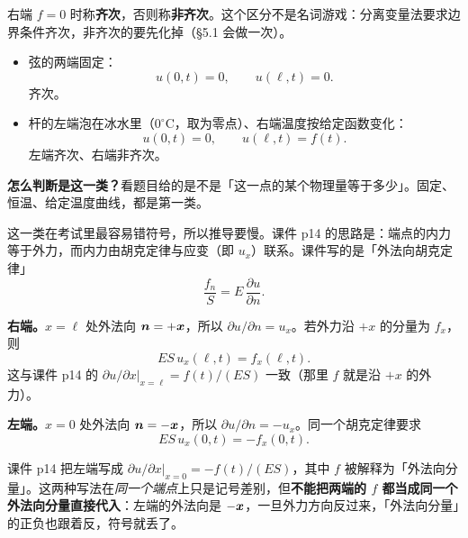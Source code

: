 \documentclass[11pt]{ctexart}
\let\origsubhdr\subhdr
\renewcommand{\subhdr}[1]{\par\needspace{3\baselineskip}\origsubhdr{#1}}
\begin{document}
右端 $f=0$ 时称\textbf{齐次}，否则称\textbf{非齐次}。这个区分不是名词游戏：分离变量法要求边界条件齐次，非齐次的要先化掉（\S5.1 会做一次）。


\begin{itemize}
  \item 弦的两端固定：
  \begin{equation}
    u(0,t)=0,\qquad u(\ell,t)=0 .
  \end{equation}
  齐次。
  \item 杆的左端泡在冰水里（$0^\circ\mathrm C$，取为零点）、右端温度按给定函数变化：
  \begin{equation}
    u(0,t)=0,\qquad u(\ell,t)=f(t).
  \end{equation}
  左端齐次、右端非齐次。
\end{itemize}

\textbf{怎么判断是这一类？}看题目给的是不是「这一点的某个物理量等于多少」。固定、恒温、给定温度曲线，都是第一类。

\label{sec:bc2}

这一类在考试里最容易错符号，所以推导要慢。课件 p14 的思路是：端点的内力等于外力，而内力由胡克定律与应变（即 $u_x$）联系。课件写的是「外法向胡克定律」
\begin{equation}
  \frac{f_n}{S}=E\,\frac{\partial u}{\partial n}.
\end{equation}

\textbf{右端。}$x=\ell$ 处外法向 $\boldsymbol{n}=+\boldsymbol{x}$，所以 $\partial u/\partial n=u_x$。若外力沿 $+x$ 的分量为 $f_x$，则
\begin{equation}
  ES\,u_x(\ell,t)=f_x(\ell,t).
\end{equation}
这与课件 p14 的 $\partial u/\partial x\big|_{x=\ell}=f(t)/(ES)$ 一致（那里 $f$ 就是沿 $+x$ 的外力）。

\textbf{左端。}$x=0$ 处外法向 $\boldsymbol{n}=-\boldsymbol{x}$，所以 $\partial u/\partial n=-u_x$。同一个胡克定律要求
\begin{equation}
  ES\,u_x(0,t)=-f_x(0,t).
\end{equation}

课件 p14 把左端写成 $\partial u/\partial x\big|_{x=0}=-f(t)/(ES)$，其中 $f$ 被解释为「外法向分量」。这两种写法在\emph{同一个端点}上只是记号差别，但\textbf{不能把两端的 $f$ 都当成同一个外法向分量直接代入}：左端的外法向是 $-\boldsymbol{x}$，一旦外力方向反过来，「外法向分量」的正负也跟着反，符号就丢了。
\end{document}
